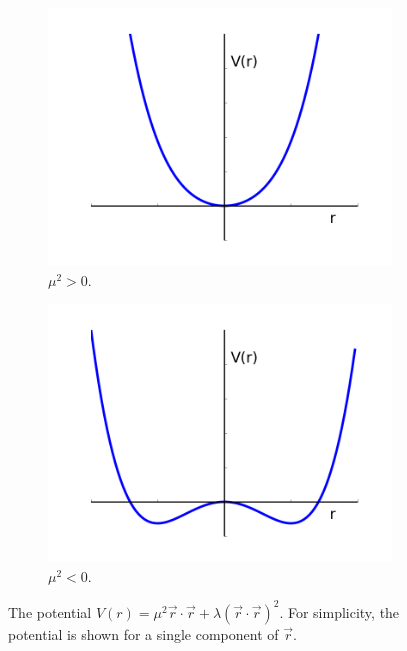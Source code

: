 \begin{figure}[htbp]
  \centering
  \begin{subfigure}{0.45\textwidth}
    \centering
    \includegraphics[width=\textwidth]{higgs_pot_mup}
    \caption{$\mu^{2}>0$.}
    \label{fig:higgs_pot_mup}
  \end{subfigure}
  \begin{subfigure}{0.45\textwidth}
    \centering
    \includegraphics[width=\textwidth]{higgs_pot_mum}
    \caption{$\mu^{2}<0$.}
    \label{fig:higgs_pot_mum}
  \end{subfigure}
  \caption{The potential $ V(r) = \mu^{2} \vec{r} \cdot \vec{r} + \lambda (
\vec{r} \cdot \vec{r} )^{2}$. For simplicity, the potential is shown for a single component of
$\vec{r}$.}
  \label{fig:higgs_pot}
\end{figure}

